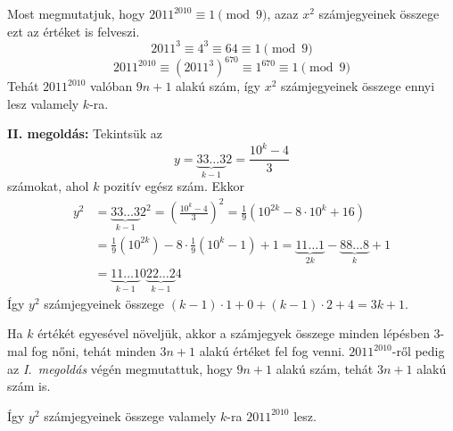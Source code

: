 \documentclass[a4paper,10pt]{article}
\begin{document}
Most megmutatjuk, hogy $2011^{2010}\equiv1\pmod{9}$, azaz $x^2$ számjegyeinek összege ezt az értéket is felveszi.
\[2011^3\equiv4^3\equiv64\equiv1\pmod9\]
\[2011^{2010}\equiv\left(2011^3\right)^{670}\equiv1^{670}\equiv1\pmod9\]
Tehát $2011^{2010}$ valóban $9n+1$ alakú szám, így $x^2$ számjegyeinek összege ennyi lesz valamely $k$-ra.

\medskip

{\bf II. megoldás: } Tekintsük az
\[y=\underbrace{33\ldots3}_{k-1}2=\frac{10^k-4}{3}\]
számokat, ahol $k$ pozitív egész szám. Ekkor
\begin{align*}
y^2&=\underbrace{33\ldots3}_{k-1}2^2=\left(\frac{10^k-4}{3}\right)^2=\frac19\left(10^{2k}-8\cdot10^k+16\right)\\
&=\frac19\left(10^{2k}\right)-8\cdot\frac19\left(10^k-1\right)+1=\underbrace{11\ldots1}_{2k}-\underbrace{88\ldots8}_k+1\\
&=\underbrace{11\ldots1}_{k-1}0\underbrace{22\ldots2}_{k-1}4
\end{align*}
Így $y^2$ számjegyeinek összege $(k-1)\cdot1+0+(k-1)\cdot2+4=3k+1$.

Ha $k$ értékét egyesével növeljük, akkor a számjegyek összege minden lépésben 3-mal fog nőni, tehát minden $3n+1$ alakú értéket fel fog venni. $2011^{2010}$-ről pedig az \textit{I.~megoldás} végén megmutattuk, hogy $9n+1$ alakú szám, tehát $3n+1$ alakú szám is.

Így $y^2$ számjegyeinek összege valamely $k$-ra $2011^{2010}$ lesz.
\end{document}
